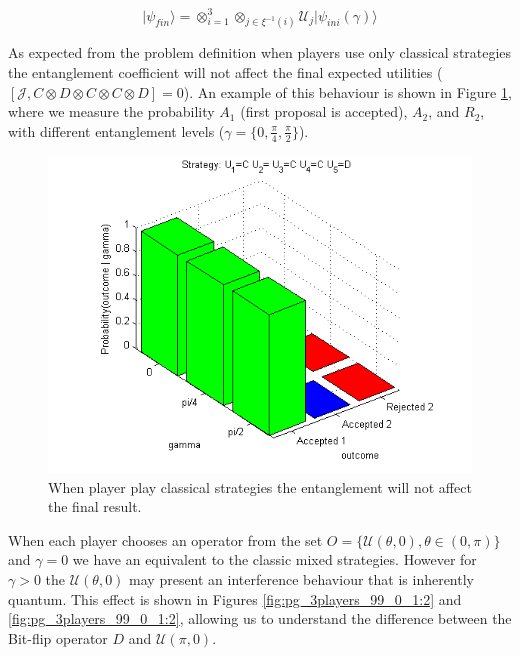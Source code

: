 \begin{equation}
\vert\psi_{fin}\rangle=\otimes_{i=1}^{3}\otimes_{j\in\xi^{-1}(i)}\mathcal{U}_{j}\vert\psi_{ini}(\gamma)\rangle
\label{eq:piratas_final_move_23}
\end{equation} 

As expected from the problem definition when players use only classical strategies the entanglement coefficient will not affect the final expected utilities ($[ \mathcal{J} , C \otimes D \otimes C \otimes C \otimes D ] = 0 $).
An example of this behaviour is shown in Figure \ref{fig:pg_3players_99_0_1}, where we measure the probability $A_{1}$ (first proposal is accepted), $A_{2}$, and $R_{2}$, with different entanglement levels ($\gamma= \{ 0 , \frac{ \pi}{4}, \frac{\pi}{2} \} $).

\begin{figure}[h!]
\centering 
\includegraphics[scale=0.80]{Figures/1.5qubit/CDCCD.png}
\caption{When player play classical strategies the entanglement will not affect the final result. }
\label{fig:pg_3players_99_0_1}
\end{figure}

When each player chooses an operator from the set $O = \{ \mathcal{U} ( \theta , 0) , \theta \in (0, \pi) \}$ and $\gamma=0$ we have an equivalent to the classic mixed strategies. However for $\gamma >0$ the $\mathcal{U} ( \theta , 0)$ may present an interference behaviour that is inherently quantum. This effect is shown in Figures \ref{fig:pg_3players_99_0_1:2} and \ref{fig:pg_3players_99_0_1:2}, allowing us to understand the difference between the Bit-flip operator $D$ and $\mathcal{U} ( \pi , 0)$.



